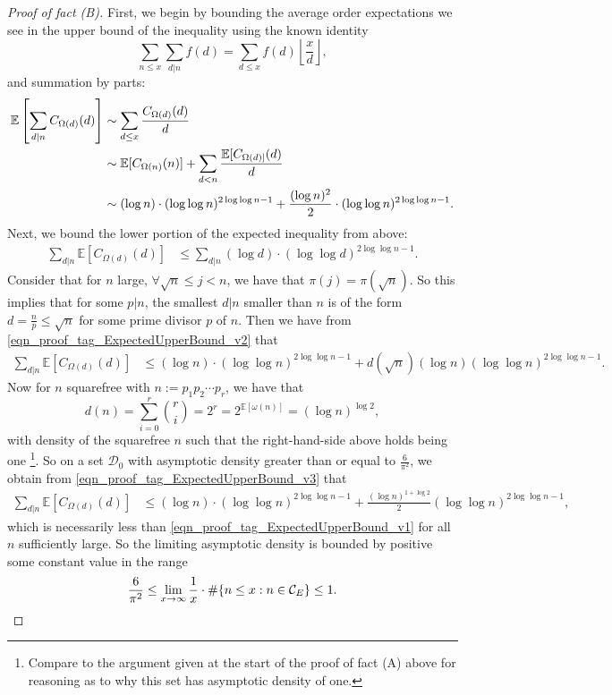 \documentclass[11pt,reqno,a4letter]{article}
\numberwithin{figure}{section}
\numberwithin{table}{section}
\newcommand{\Floor}[2]{\ensuremath{\left\lfloor \frac{#1}{#2} \right\rfloor}}
\theoremstyle{plain}
\numberwithin{theorem}{section}
\theoremstyle{definition}
\begin{document}
\begin{proof}[Proof of fact (B)]
First, we begin by bounding the average order expectations we see in the upper bound of the 
inequality using the known identity 
\[
\sum_{n \leq x} \sum_{d|n} f(d) = \sum_{d \leq x} f(d) \Floor{x}{d}, 
\]
and summation by parts: 
\begin{align} 
\notag 
\mathbb{E}\left[\sum_{d|n} C_{\Omega(d)}(d)\right] & \sim \sum_{d \leq x} \frac{C_{\Omega(d)}(d)}{d} \\ 
\notag 
     & \sim \mathbb{E}[C_{\Omega(n)}(n)] + \sum_{d<n} \frac{\mathbb{E}[C_{\Omega(d)]}(d)}{d} \\ 
\label{eqn_proof_tag_ExpectedUpperBound_v1} 
     & \sim (\log n) \cdot (\log\log n)^{2\log\log n - 1} + \frac{(\log n)^2}{2} \cdot (\log\log n)^{2\log\log n - 1}. 
\end{align} 
Next, we bound the lower portion of the expected inequality from above: 
\begin{align} 
\label{eqn_proof_tag_ExpectedUpperBound_v2} 
\sum_{d|n} \mathbb{E}[C_{\Omega(d)}(d)] & \leq \sum_{d|n} (\log d) \cdot (\log\log d)^{2\log\log n - 1}. 
\end{align} 
Consider that for $n$ large, $\forall \sqrt{n} \leq j < n$, we have that $\pi(j) = \pi(\sqrt{n})$. 
So this implies that for some $p|n$, the smallest $d|n$ smaller than $n$ is of the form 
$d = \frac{n}{p} \leq \sqrt{n}$ for some prime divisor $p$ of $n$. Then we have from 
\eqref{eqn_proof_tag_ExpectedUpperBound_v2} that 
\begin{align} 
\label{eqn_proof_tag_ExpectedUpperBound_v3} 
\sum_{d|n} \mathbb{E}[C_{\Omega(d)}(d)] & \leq (\log n) \cdot (\log\log n)^{2\log\log n - 1} + 
     d(\sqrt{n}) (\log n) (\log\log n)^{2\log\log n - 1}. 
\end{align} 
Now for $n$ squarefree with $n := p_1p_2 \cdots p_r$, we have that 
\[
d(n) = \sum_{i=0}^{r} \binom{r}{i} = 2^r = 2^{\mathbb{E}[\omega(n)]} = (\log n)^{\log 2}, 
\]
with density of the squarefree $n$ such that the right-hand-side above holds being one \footnote{ 
     Compare to the argument given at the start of the proof of fact (A) above for reasoning as to 
     why this set has asymptotic density of one. 
}. 
So on a set $\mathcal{D}_0$ with asymptotic density greater than or equal to $\frac{6}{\pi^2}$, 
we obtain from \eqref{eqn_proof_tag_ExpectedUpperBound_v3} that 
\begin{align} 
\sum_{d|n} \mathbb{E}[C_{\Omega(d)}(d)] & \leq (\log n) \cdot (\log\log n)^{2\log\log n - 1} + 
     \frac{(\log n)^{1+\log 2}}{2} (\log\log n)^{2\log\log n - 1}, 
\end{align} 
which is necessarily less than \eqref{eqn_proof_tag_ExpectedUpperBound_v1} for all $n$ sufficiently 
large. So the limiting asymptotic density is bounded by positive some constant value in the range 
\[
\frac{6}{\pi^2} \leq \lim_{x \rightarrow \infty} 
     \frac{1}{x} \cdot \#\{n \leq x: n \in \mathcal{C}_E\} \leq 1. 
     \qedhere
\]
\end{proof}  
\end{document}
